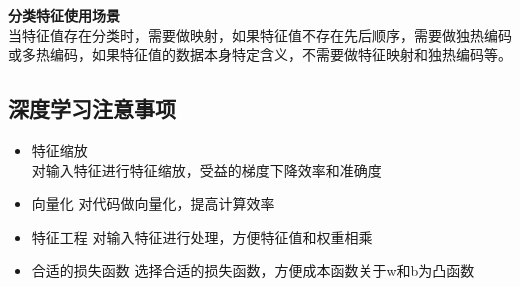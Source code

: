 \textbf{分类特征使用场景} \\
当特征值存在分类时，需要做映射，如果特征值不存在先后顺序，需要做独热编码或多热编码，如果特征值的数据本身特定含义，不需要做特征映射和独热编码等。


\subsection{深度学习注意事项}
\begin{itemize}
	\item 特征缩放 \\
	对输入特征进行特征缩放，受益的梯度下降效率和准确度
	\item 向量化
	对代码做向量化，提高计算效率
	\item 特征工程
	对输入特征进行处理，方便特征值和权重相乘
	\item 合适的损失函数
	选择合适的损失函数，方便成本函数关于w和b为凸函数
\end{itemize}